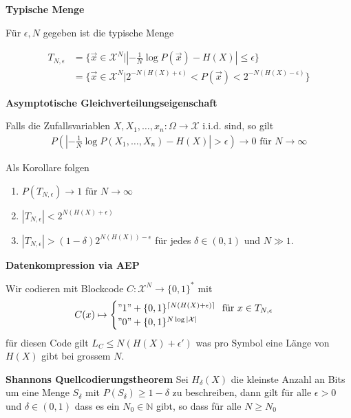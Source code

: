 \documentclass[25pt]{sciposter}
\newcommand{\N}{\mathbb{N}}
\newenvironment{defn}[1]{\begin{mdframed}[backgroundcolor=blue!10,innertopmargin=15pt, nobreak=true,innerbottommargin=15pt]
		\textbf{#1 }
	}
	{ 
	\end{mdframed}
}
\newenvironment{thm}[1]{\begin{mdframed}[nobreak=true,backgroundcolor=Emerald!10,innertopmargin=15pt, innerbottommargin=15pt]
		\textbf{#1 }
	}
	{ 
	\end{mdframed}
}
\begin{document}
\begin{multicols}{3}
\begin{defn}{Typische Menge}
	
	Für $\epsilon, N$ gegeben ist die typische Menge
	
	\begin{align*}
		T_{N,\epsilon} &= \bigg\{ \vec{x} \in \mathcal{X}^N |  \left| -\frac{1}{N}\log P(\vec{x}) - H(X) \right|  \leq \epsilon \bigg \}\\
		&= \bigg\{ \vec{x} \in \mathcal{X}^N | 2^{-N(H(X)+\epsilon)} < P(\vec{x}) < 2^{-N(H(X)-\epsilon)} \bigg \}
	\end{align*}
\end{defn}


\begin{thm}{Asymptotische Gleichverteilungseigenschaft}
	Falls die Zufallsvariablen $X,X_1,\ldots,x_n:\Omega\to \mathcal{X}$ i.i.d. sind, so gilt
	\begin{align*}
P\left( \left| -\frac{1}{N}\log P(X_1,\ldots,X_n) - H(X) \right|  > \epsilon \right) \to 0  \text{ für } N \to \infty
	\end{align*}
	
	Als Korollare folgen
	\begin{enumerate}
		\item $P(T_{N,\epsilon}) \to 1$ für $N \to \infty$
		\item $|T_{N,\epsilon}| < 2^{N(H(X) + \epsilon)}$
		\item $|T_{N,\epsilon}| > (1-\delta)2^{N(H(X)) - \epsilon}$ für jedes $\delta \in (0,1)$ und $N \gg 1$.
	\end{enumerate}
\end{thm}


\begin{defn}{Datenkompression via AEP}
Wir codieren mit Blockcode $C:\mathcal{X}^N \to \{0,1\}^*$ mit 
\begin{align*}
	C(x) \mapsto \begin{cases}
	"1" + \{0,1\}^{\lceil N(H(X) + \epsilon) \rceil} \ \text{ für } x \in T_{N,\epsilon}\\
	"0" + \{0,1\}^{N\log |\mathcal{X}|}
	\end{cases}
\end{align*}
für diesen Code gilt $L_C \leq N(H(X) + \epsilon')$ was pro Symbol eine Länge von $H(X)$ gibt bei grossem $N$.
\end{defn}



\begin{thm}{Shannons Quellcodierungstheorem} Sei $H_\delta(X)$ die kleinste Anzahl an Bits um eine Menge $S_\delta$ mit $P(S_\delta)\geq 1-\delta$ zu beschreiben, dann gilt für alle $\epsilon > 0$ und $\delta\in (0,1)$ dass es ein $N_0 \in \N$ gibt, so dass für alle $N \geq N_0$
	

\end{thm}
\end{multicols}
\end{document}
